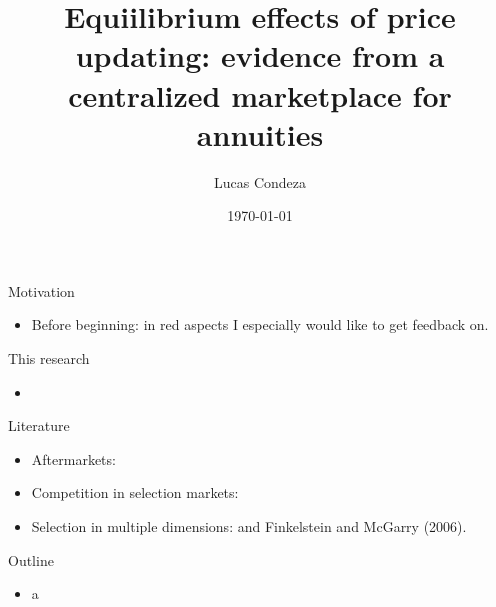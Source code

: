 \documentclass[10pt,aspectratio=169]{beamer}
\title{Equiilibrium effects of price updating: evidence from a centralized marketplace for annuities}
\author{%
 Lucas Condeza
\inst{1} \and
}
\institute{
  \inst{1} Yale University \\
}
\date{\today}
\begin{document}
\begin{frame}
  \titlepage
\end{frame}




\begin{frame}{Motivation}
\begin{itemize}
    \item  Before beginning: in red aspects I especially would like to get feedback on. 
\end{itemize}
\end{frame}


\begin{frame}{This research}
\begin{itemize}
    \item 
\end{itemize}
\end{frame}


\begin{frame}{Literature}
\begin{itemize}
    \item Aftermarkets: \textcite{larsen_efficiency_2021, allen_search_2019}

    \item Competition in selection markets: \textcite{mahoney_imperfect_2017, cuesta_price_2018, cosconati_competing_2025}

    \item Selection in multiple dimensions: \textcite{finkelstein_adverse_2004} and Finkelstein and McGarry (2006).  
\end{itemize}

\end{frame}




\begin{frame}{Outline}
\begin{itemize}
    \item a
\end{itemize}
\end{frame}
\end{document}
